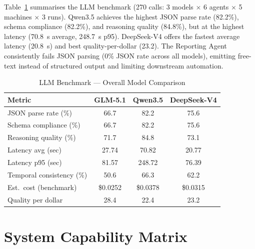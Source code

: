 Table~\ref{tab:llm_bmk} summarises the LLM benchmark (270 calls: 3 models $\times$ 6 agents $\times$ 5 machines $\times$ 3 runs). Qwen3.5 achieves the highest JSON parse rate (82.2\%), schema compliance (82.2\%), and reasoning quality (84.8\%), but at the highest latency (70.8~s average, 248.7~s p95). DeepSeek-V4 offers the fastest average latency (20.8~s) and best quality-per-dollar (23.2). The Reporting Agent consistently fails JSON parsing (0\% JSON rate across all models), emitting free-text instead of structured output and limiting downstream automation.
\begin{table}[!htbp]
\centering
\caption{LLM Benchmark --- Overall Model Comparison}
\label{tab:llm_bmk}
\begin{tabular}{lccc}
\hline
\textbf{Metric} & \textbf{GLM-5.1} & \textbf{Qwen3.5} & \textbf{DeepSeek-V4} \\
\hline
JSON parse rate (\%)   & 66.7 & 82.2 & 75.6 \\
Schema compliance (\%) & 66.7 & 82.2 & 75.6 \\
Reasoning quality (\%) & 71.7 & 84.8 & 73.1 \\
Latency avg (sec)      & 27.74 & 70.82 & 20.77 \\
Latency p95 (sec)      & 81.57 & 248.72 & 76.39 \\
Temporal consistency (\%) & 50.6 & 66.3 & 62.2 \\
Est.\ cost (benchmark) & \$0.0252 & \$0.0378 & \$0.0315 \\
Quality per dollar     & 28.4 & 22.4 & 23.2 \\
\hline
\end{tabular}
\end{table}
\section{System Capability Matrix}

